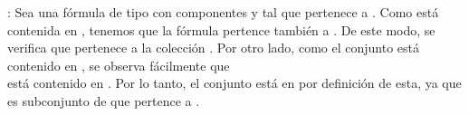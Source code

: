 \begin{isabellebody}
\begin{isamarkuptext}
\begin{demostracion}
  : Sea una fórmula de tipo \isa{{\isasymalpha}} con componentes  y 
     tal que \isa{{\isasymalpha}} pertenece a . Como  está contenida en , tenemos que la fórmula 
    pertence también a . De este modo, se verifica que  pertenece a la colección 
    . Por otro lado, como el conjunto  está contenido en , se observa fácilmente que\\
     está contenido en . Por lo tanto, el conjunto  está en 
     por definición de esta, ya que es subconjunto de  que pertence a .


\end{demostracion}
\end{isamarkuptext}
\end{isabellebody}
